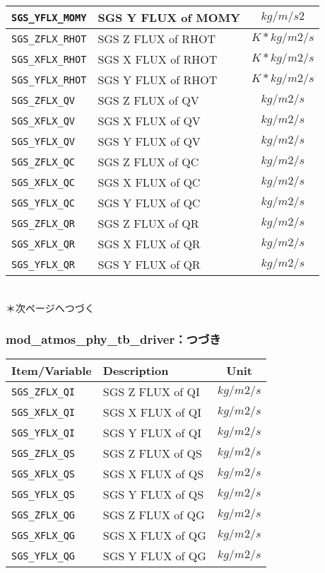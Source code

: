 \begin{tabularx}{150mm}{|l|X|c|}
  \verb|SGS_YFLX_MOMY| & SGS Y FLUX of MOMY & $kg/m/s2$ \\\hline
  \verb|SGS_ZFLX_RHOT| & SGS Z FLUX of RHOT & $K*kg/m2/s$ \\\hline
  \verb|SGS_XFLX_RHOT| & SGS X FLUX of RHOT & $K*kg/m2/s$ \\\hline
  \verb|SGS_YFLX_RHOT| & SGS Y FLUX of RHOT & $K*kg/m2/s$ \\\hline
  \verb|SGS_ZFLX_QV|   & SGS Z FLUX of QV   & $kg/m2/s$ \\\hline
  \verb|SGS_XFLX_QV|   & SGS X FLUX of QV   & $kg/m2/s$ \\\hline
  \verb|SGS_YFLX_QV|   & SGS Y FLUX of QV   & $kg/m2/s$ \\\hline
  \verb|SGS_ZFLX_QC|   & SGS Z FLUX of QC   & $kg/m2/s$ \\\hline
  \verb|SGS_XFLX_QC|   & SGS X FLUX of QC   & $kg/m2/s$ \\\hline
  \verb|SGS_YFLX_QC|   & SGS Y FLUX of QC   & $kg/m2/s$ \\\hline
  \verb|SGS_ZFLX_QR|   & SGS Z FLUX of QR   & $kg/m2/s$ \\\hline
  \verb|SGS_XFLX_QR|   & SGS X FLUX of QR   & $kg/m2/s$ \\\hline
  \verb|SGS_YFLX_QR|   & SGS Y FLUX of QR   & $kg/m2/s$ \\\hline
 \end{tabularx}
　\\
\indent ＊次ページへつづく

\subsubsection{mod\_atmos\_phy\_tb\_driver：つづき}
 \begin{tabularx}{150mm}{|l|X|c|} \hline
 \rowcolor[gray]{0.9} Item/Variable & Description  & Unit \\ \hline
  \verb|SGS_ZFLX_QI|   & SGS Z FLUX of QI   & $kg/m2/s$ \\\hline
  \verb|SGS_XFLX_QI|   & SGS X FLUX of QI   & $kg/m2/s$ \\\hline
  \verb|SGS_YFLX_QI|   & SGS Y FLUX of QI   & $kg/m2/s$ \\\hline
  \verb|SGS_ZFLX_QS|   & SGS Z FLUX of QS   & $kg/m2/s$ \\\hline
  \verb|SGS_XFLX_QS|   & SGS X FLUX of QS   & $kg/m2/s$ \\\hline
  \verb|SGS_YFLX_QS|   & SGS Y FLUX of QS   & $kg/m2/s$ \\\hline
  \verb|SGS_ZFLX_QG|   & SGS Z FLUX of QG   & $kg/m2/s$ \\\hline
  \verb|SGS_XFLX_QG|   & SGS X FLUX of QG   & $kg/m2/s$ \\\hline
  \verb|SGS_YFLX_QG|   & SGS Y FLUX of QG   & $kg/m2/s$ \\\hline
 \end{tabularx}

